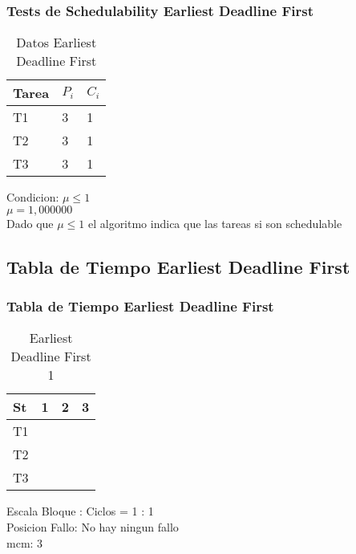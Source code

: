 \documentclass[xcolor=table]{beamer}
\begin{document}
\begin{frame} 
\frametitle{Tests de Schedulability  Earliest Deadline First } 
\begin{table} 
\centering 
\begin{tabular}{|l|l|l|} 
\hline 
\cellcolor{lightgray}Tarea & \cellcolor{lightgray}$P_i$ & \cellcolor{lightgray}$C_i$ \\ \hline 
T1   & 3  &  1\\ \hline 
T2   & 3  &  1\\ \hline 
T3   & 3  &  1\\ \hline 
\end{tabular} 
\caption{Datos  Earliest Deadline First } 
\end{table} 
Condicion: $\mu \leq 1$ \\ 
$\mu =  1,000000 $ \\ 
Dado que $\mu \leq 1$ el algoritmo indica que las tareas si son schedulable \\ 
\end{frame} 

\subsection{Tabla de Tiempo  Earliest Deadline First } 

\begin{frame} 
\frametitle{Tabla de Tiempo  Earliest Deadline First } 
\begin{table} 
\centering 
\begin{tabular}{|l|l|l|l|} 
\hline 
St &  1 \cellcolor{green} &  2 \cellcolor{green} &  3 \cellcolor{green} \\ \hline 
T1 & & & \cellcolor{blue} \\ \hline 
T2 & & \cellcolor{purple} & \\ \hline 
T3 & \cellcolor{cyan} & & \\ \hline 
\end{tabular} 
\caption{ Earliest Deadline First 1 } 
\end{table} 
Escala Bloque : Ciclos = 1 : 1 \\ 
Posicion Fallo: No hay ningun fallo \\ 
mcm:  3 \\ 
\end{frame} 

\end{document}
